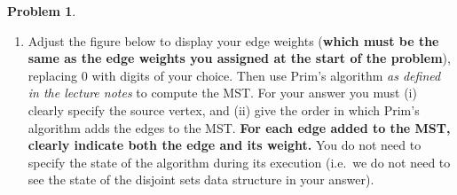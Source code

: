 \documentclass[11pt]{article}
\theoremstyle{definition}
\theoremstyle{definition}
\newtheorem{required}{Problem}
\theoremstyle{definition}
\begin{document}
\begin{required}
\begin{enumerate}[label=(\alph*)]
\begin{center}
\end{center}

\begin{proof}[Answer]
Add (A, B), of weight 1.
Add (A, C), of weight 2.
Add (A, E), of weight 3. 
Skip (B, C).
Skip (B, E).
Add (B, D), of weight 6.
Done. 
Total weight: 12.
\end{proof}







\newpage
\subsection{Standard 8: Prim's Algorithm}
\item Adjust the figure below to display your edge weights (\textbf{which must be the same as the edge weights you assigned at the start of the problem}), replacing 0 with digits of your choice. Then use Prim's algorithm \emph{as defined in the lecture notes} to compute the MST\@. For your answer you must (i) clearly specify the source vertex, and (ii) give the order in which Prim's algorithm adds the edges to the MST\@.  \textbf{For each edge added to the MST, clearly indicate both the edge and its weight.} You do not need to specify the state of the algorithm during its execution (i.e.\ we do not need to see the state of the disjoint sets data structure in your answer).


\end{enumerate}
\end{required}
\end{document}
